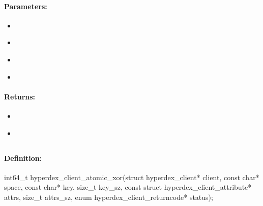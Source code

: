 \paragraph{Parameters:}
\begin{itemize}[noitemsep]
\item {}\\

\item {}\\

\item {}\\

\item {}\\

\end{itemize}

\paragraph{Returns:}
\begin{itemize}[noitemsep]
\item {}\\

\item {}\\

\end{itemize}

\pagebreak
\subsection{}
\label{api:c:atomic_xor}


\paragraph{Definition:}
\begin{ccode}
int64_t hyperdex_client_atomic_xor(struct hyperdex_client* client,
        const char* space,
        const char* key, size_t key_sz,
        const struct hyperdex_client_attribute* attrs, size_t attrs_sz,
        enum hyperdex_client_returncode* status);
\end{ccode}

